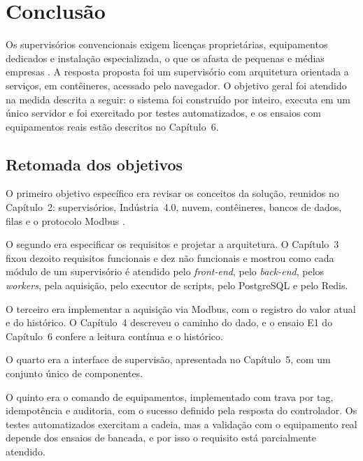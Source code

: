 \newpage
\section{Conclusão}

\par Os supervisórios convencionais exigem licenças proprietárias, equipamentos dedicados e instalação especializada, o que os afasta de pequenas e médias empresas \cite{ZANGHI2019_SCADA_CONCEITOS,PHUYAL2020_COST_EFFICIENT_SCADA}. A resposta proposta foi um supervisório com arquitetura orientada a serviços, em contêineres, acessado pelo navegador. O objetivo geral foi atendido na medida descrita a seguir: o sistema foi construído por inteiro, executa em um único servidor e foi exercitado por testes automatizados, e os ensaios com equipamentos reais estão descritos no Capítulo~6.

\subsection{Retomada dos objetivos}

\par O primeiro objetivo específico era revisar os conceitos da solução, reunidos no Capítulo~2: supervisórios, Indústria~4.0, nuvem, contêineres, bancos de dados, filas e o protocolo Modbus \cite{COLOMBO2014_STATE_ART_AUTOMATION,LASI_INDUSTRY_40}.

\par O segundo era especificar os requisitos e projetar a arquitetura. O Capítulo~3 fixou dezoito requisitos funcionais e dez não funcionais e mostrou como cada módulo de um supervisório é atendido pelo \emph{front-end}, pelo \emph{back-end}, pelos \emph{workers}, pela aquisição, pelo executor de scripts, pelo PostgreSQL e pelo Redis.

\par O terceiro era implementar a aquisição via Modbus, com o registro do valor atual e do histórico. O Capítulo~4 descreveu o caminho do dado, e o ensaio E1 do Capítulo~6 confere a leitura contínua e o histórico.

\par O quarto era a interface de supervisão, apresentada no Capítulo~5, com um conjunto único de componentes.

\par O quinto era o comando de equipamentos, implementado com trava por tag, idempotência e auditoria, com o sucesso definido pela resposta do controlador. Os testes automatizados exercitam a cadeia, mas a validação com o equipamento real depende dos ensaios de bancada, e por isso o requisito está parcialmente atendido.

